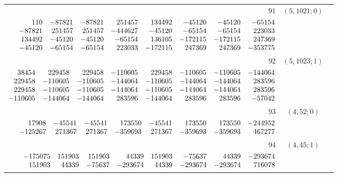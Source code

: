 \documentclass[11pt]{article}
\theoremstyle{remark}
\numberwithin{equation}{section}
\begin{document}
\begin{longtable}{rcl}
91 & $(5,1021;0)$ & \begin{tabular}[t]{@{}l@{}}$w_i=\displaystyle \frac{1846732871507397}{5908231139719040000000000000000000}$\\[3pt]{\scriptsize$\begin{array}{@{}rrrrrrrr@{}}110 & -87821 & -87821 & 251457 & 134492 & -45120 & -45120 & -65154\\-87821 & 251457 & 251457 & -444627 & -45120 & -65154 & -65154 & 223033\\134492 & -45120 & -45120 & -65154 & 136105 & -172115 & -172115 & 247369\\-45120 & -65154 & -65154 & 223033 & -172115 & 247369 & 247369 & -353775\end{array}$}\end{tabular}\\[8pt]
92 & $(5,1023;1)$ & \begin{tabular}[t]{@{}l@{}}$w_i=\displaystyle \frac{18518492245803023}{52346964604387218750000000000000000}$\\[3pt]{\scriptsize$\begin{array}{@{}rrrrrrrr@{}}38454 & 229458 & 229458 & -110605 & 229458 & -110605 & -110605 & -144064\\229458 & -110605 & -110605 & -144064 & -110605 & -144064 & -144064 & 283596\\229458 & -110605 & -110605 & -144064 & -110605 & -144064 & -144064 & 283596\\-110605 & -144064 & -144064 & 283596 & -144064 & 283596 & 283596 & -57042\end{array}$}\end{tabular}\\[8pt]
93 & $(4,52;0)$ & \begin{tabular}[t]{@{}l@{}}$w_i=\displaystyle \frac{3532848272568855501}{940832706473123648000000000000000000}$\\[3pt]{\scriptsize$\begin{array}{@{}rrrrrrrr@{}}17908 & -45541 & -45541 & 173550 & -45541 & 173550 & 173550 & -244952\\-125267 & 271367 & 271367 & -359693 & 271367 & -359693 & -359693 & 467277\end{array}$}\end{tabular}\\[8pt]
94 & $(4,45;1)$ & \begin{tabular}[t]{@{}l@{}}$w_i=\displaystyle \frac{8926077345717279209}{839370681756602992000000000000000000}$\\[3pt]{\scriptsize$\begin{array}{@{}rrrrrrrr@{}}-175075 & 151903 & 151903 & 44339 & 151903 & -75637 & 44339 & -293674\\151903 & 44339 & -75637 & -293674 & 44339 & -293674 & -293674 & 716078\end{array}$}\end{tabular}\\[8pt]

\end{longtable}
\end{document}
